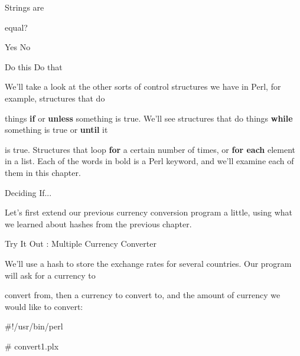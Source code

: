 \documentclass[a4paper,11pt]{book}
\begin{document}
\noindent 

\noindent 

\noindent 

\noindent Strings are

\noindent equal?

\noindent 

\noindent Yes No

\noindent 

\noindent 

\noindent 

\noindent Do this Do that

\noindent 

\noindent 

\noindent 

\noindent We'll take a look at the other sorts of control structures we have in Perl, for example, structures that do

\noindent things \textbf{if }or \textbf{unless }something is true. We'll see structures that do things \textbf{while }something is true or \textbf{until }it

\noindent is true. Structures that loop \textbf{for }a certain number of times, or \textbf{for each }element in a list. Each of the words in bold is a Perl keyword, and we'll examine each of them in this chapter.

\noindent 

\noindent 

\noindent Deciding If...

\noindent 

\noindent Let's first extend our previous currency conversion program a little, using what we learned about hashes from the previous chapter.

\noindent 

\noindent 

\noindent Try It Out : Multiple Currency Converter

\noindent 

\noindent 

\noindent We'll use a hash to store the exchange rates for several countries. Our program will ask for a currency to

\noindent convert from, then a currency to convert to, and the amount of currency we would like to convert:

\noindent 

\noindent 

\noindent \#!/usr/bin/perl

\noindent \# convert1.plx
\end{document}
